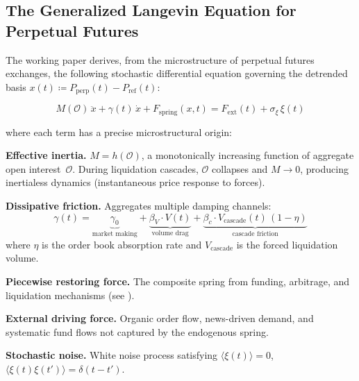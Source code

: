 \documentclass[11pt,a4paper]{article}
\newcommand{\Fext}{F_{\mathrm{ext}}}
\newcommand{\Fspring}{F_{\mathrm{spring}}}
\newcommand{\OI}{\mathcal{O}}
\begin{document}
\subsection{The Generalized Langevin Equation for Perpetual Futures}

The working paper derives, from the microstructure of perpetual futures 
exchanges, the following stochastic differential equation governing the 
detrended basis $x(t) \coloneqq P_{\mathrm{perp}}(t) - P_{\mathrm{ref}}(t)$:

\begin{tcolorbox}[boxstyle, title=Generalized Langevin Equation]
\begin{equation}
\label{eq:langevin}
\boxed{
M(\OI)\,\ddot{x} + \gamma(t)\,\dot{x} + \Fspring(x,t) = \Fext(t) + \sigma_{\xi}\,\xi(t)
}
\end{equation}
\end{tcolorbox}

\noindent where each term has a precise microstructural origin:

\begin{description}[leftmargin=2cm,style=nextline]
    \item[$M(\OI)$] \textbf{Effective inertia.} $M = h(\OI)$, a monotonically 
    increasing function of aggregate open interest~$\OI$. During liquidation 
    cascades, $\OI$ collapses and $M \to 0$, producing inertialess dynamics 
    (instantaneous price response to forces).

    \item[$\gamma(t)\,\dot{x}$] \textbf{Dissipative friction.} Aggregates 
    multiple damping channels:
    \begin{equation}
    \label{eq:gamma}
    \gamma(t) = \underbrace{\gamma_0}_{\text{market making}} 
    + \underbrace{\beta_V \cdot V(t)}_{\text{volume drag}} 
    + \underbrace{\beta_c \cdot V_{\text{cascade}}(t)\,(1-\eta)}_{\text{cascade friction}}
    \end{equation}
    where $\eta$ is the order book absorption rate and $V_{\text{cascade}}$ is 
    the forced liquidation volume.

    \item[$\Fspring(x,t)$] \textbf{Piecewise restoring force.} The composite 
    spring from funding, arbitrage, and liquidation mechanisms (see 
    ).

    \item[$\Fext(t)$] \textbf{External driving force.} Organic order flow, 
    news-driven demand, and systematic fund flows not captured by the 
    endogenous spring.

    \item[$\sigma_{\xi}\,\xi(t)$] \textbf{Stochastic noise.} White noise 
    process satisfying $\langle \xi(t)\rangle = 0$, 
    $\langle \xi(t)\xi(t')\rangle = \delta(t-t')$.
\end{description}
\end{document}
